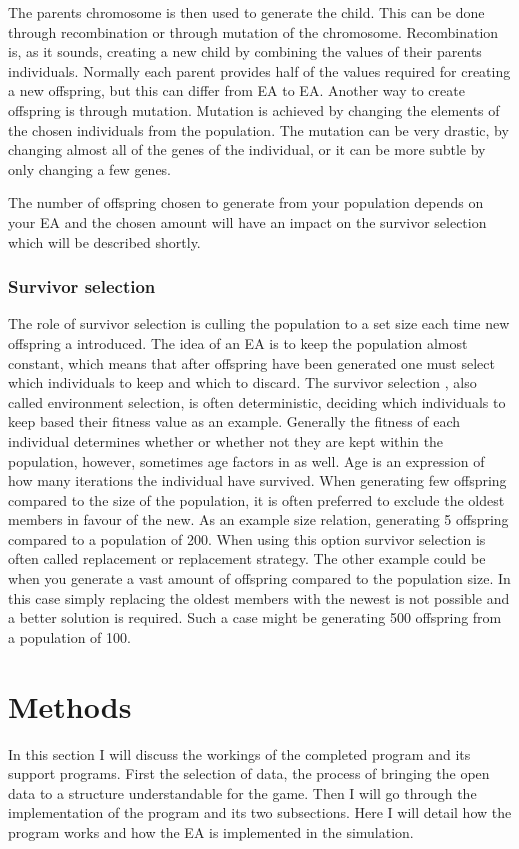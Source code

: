 \documentclass[a4paper,11pt]{article}
\begin{document}
The parents chromosome is then used to generate the child. This can be done through recombination or through mutation of the chromosome. 
Recombination is, as it sounds, creating a new child by combining the values of their parents individuals. Normally each parent provides half of the values required for creating a new offspring, but this can differ from EA to EA.
Another way to create offspring is through mutation. Mutation is achieved by changing the elements of the chosen individuals from the population. The mutation can be very drastic, by changing almost all of the genes of the individual, or it can be more subtle by only changing a few genes. 

The number of offspring chosen to generate from your population depends on your EA and the chosen amount will have an impact on the survivor selection which will be described shortly.

\subsubsection{Survivor selection}
The role of survivor selection is culling the population to a set size each time new offspring a introduced. The idea of an EA is to keep the population almost constant, which means that after offspring have been generated one must select which individuals to keep and which to discard. The survivor selection , also called environment selection, is often deterministic, deciding which individuals to keep based their fitness value as an example. Generally the fitness of each individual determines whether or whether not they are kept within the population, however, sometimes age factors in as well. Age is an expression of how many iterations the individual have survived. When generating few offspring compared to the size of the population, it is often preferred to exclude the oldest members in favour of the new. As an example size relation, generating 5 offspring compared to a population of 200. When using this option survivor selection is often called replacement or replacement strategy.
The other example could be when you generate a vast amount of offspring compared to the population size. In this case simply replacing the oldest members with the newest is not possible and a better solution is required. Such a case might be generating 500 offspring from a population of 100. 


\section{Methods}
In this section I will discuss the workings of the completed program and its support programs. First the selection of data, the process of bringing the open data to a structure understandable for the game. Then I will go through the implementation of the program and its two subsections. Here I will detail how the program works and how the EA is implemented in the simulation. 
\end{document}
